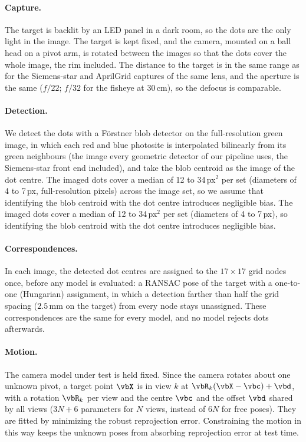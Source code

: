 \paragraph{Capture.}
The target is backlit by an LED panel in a dark room, so the dots are the only light in the image. The target is kept fixed, and the camera, mounted on a ball head on a pivot arm, is rotated between the images so that the dots cover the whole image, the rim included. The distance to the target is in the same range as for the Siemens-star and AprilGrid captures of the same lens, and the aperture is the same ($f/22$; $f/32$ for the fisheye at $30\,\mathrm{cm}$), so the defocus is comparable.

\paragraph{Detection.}
We detect the dots with a Förstner blob detector on the full-resolution green image, in which each red and blue photosite is interpolated bilinearly from its green neighbours (the image every geometric detector of our pipeline uses, the Siemens-star front end included), \cite{forstner1987fast} and take the blob centroid as the image of the dot centre. The imaged dots cover a median of 12 to 34\,px$^2$ per set (diameters of 4 to 7\,px, full-resolution pixels) across the image set, so we assume that identifying the blob centroid with the dot centre introduces negligible bias. The imaged dots cover a median of 12 to 34\,px$^2$ per set (diameters of 4 to 7\,px), so identifying the blob centroid with the dot centre introduces negligible bias.

\paragraph{Correspondences.}
In each image, the detected dot centres are assigned to the $17\times17$ grid nodes once, before any model is evaluated: a RANSAC pose of the target with a one-to-one (Hungarian) assignment, in which a detection farther than half the grid spacing ($2.5\,\mathrm{mm}$ on the target) from every node stays unassigned.
These correspondences are the same for every model, and no model rejects dots afterwards.

\paragraph{Motion.}
The camera model under test is held fixed. Since the camera rotates about one unknown pivot, a target point $\vbX$ is in view $k$ at $\vbR_k(\vbX-\vbc)+\vbd$, with a rotation $\vbR_k$ per view and the centre $\vbc$ and the offset $\vbd$ shared by all views ($3N+6$ parameters for $N$ views, instead of $6N$ for free poses). They are fitted by minimizing the robust reprojection error. Constraining the motion in this way keeps the unknown poses from absorbing reprojection error at test time.

